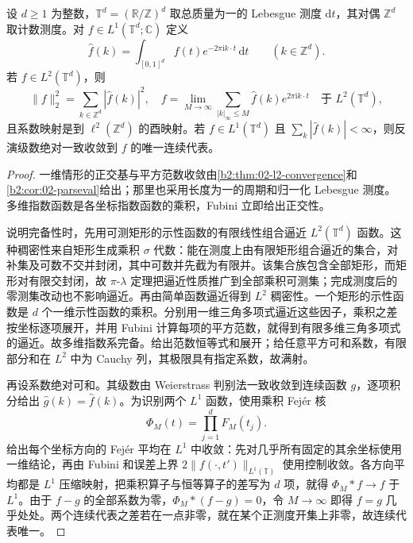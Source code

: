 \begin{theorem}\label{b2:thm:I4-torus-fourier}
设 \(d\ge1\) 为整数，\(\mathbb T^d=(\mathbb R/\mathbb Z)^d\) 取总质量为一的 Lebesgue 测度 \(\mathrm dt\)，其对偶 \(\mathbb Z^d\) 取计数测度。对 \(f\in L^1(\mathbb T^d;\mathbb C)\) 定义
\[
 \widehat f(k)=\int_{[0,1]^d}f(t)e^{-2\pi\mathrm i k\cdot t}\,\mathrm dt
 \qquad(k\in\mathbb Z^d).
\]
若 \(f\in L^2(\mathbb T^d)\)，则
\[
 \|f\|_2^2=\sum_{k\in\mathbb Z^d}|\widehat f(k)|^2,
 \quad
 f=\lim_{M\to\infty}\sum_{|k|_\infty\le M}
             \widehat f(k)e^{2\pi\mathrm i k\cdot t}
             \quad\text{于 }L^2(\mathbb T^d),
\]
且系数映射是到 \(\ell^2(\mathbb Z^d)\) 的酉映射。若 \(f\in L^1(\mathbb T^d)\) 且 \(\sum_k|\widehat f(k)|<\infty\)，则反演级数绝对一致收敛到 \(f\) 的唯一连续代表。
\end{theorem}
\begin{proof}
一维情形的正交基与平方范数收敛由\cref{b2:thm:02-l2-convergence}和\cref{b2:cor:02-parseval}给出；那里也采用长度为一的周期和归一化 Lebesgue 测度。多维指数函数是各坐标指数函数的乘积，Fubini 立即给出正交性。

说明完备性时，先用可测矩形的示性函数的有限线性组合逼近 \(L^2(\mathbb T^d)\) 函数。这种稠密性来自矩形生成乘积 \(\sigma\) 代数：能在测度上由有限矩形组合逼近的集合，对补集及可数不交并封闭，其中可数并先截为有限并。该集合族包含全部矩形，而矩形对有限交封闭，故 \(\pi\)-\(\lambda\) 定理把逼近性质推广到全部乘积可测集；完成测度后的零测集改动也不影响逼近。再由简单函数逼近得到 \(L^2\) 稠密性。一个矩形的示性函数是 \(d\) 个一维示性函数的乘积。分别用一维三角多项式逼近这些因子，乘积之差按坐标逐项展开，并用 Fubini 计算每项的平方范数，就得到有限多维三角多项式的逼近。故多维指数系完备。给出范数恒等式和展开；给任意平方可和系数，有限部分和在 \(L^2\) 中为 Cauchy 列，其极限具有指定系数，故满射。

再设系数绝对可和。其级数由 Weierstrass 判别法一致收敛到连续函数 \(g\)，逐项积分给出 \(\widehat g(k)=\widehat f(k)\)。为识别两个 \(L^1\) 函数，使用乘积 Fejér 核
\[
 \Phi_M(t)=\prod_{j=1}^d F_M(t_j).
\]
给出每个坐标方向的 Fejér 平均在 \(L^1\) 中收敛：先对几乎所有固定的其余坐标使用一维结论，再由 Fubini 和误差上界 \(2\|f(\cdot,t')\|_{L^1(\mathbb T)}\) 使用控制收敛。各方向平均都是 \(L^1\) 压缩映射，把乘积算子与恒等算子的差写为 \(d\) 项，就得 \(\Phi_M*f\to f\) 于 \(L^1\)。由于 \(f-g\) 的全部系数为零，\(\Phi_M*(f-g)=0\)，令 \(M\to\infty\) 即得 \(f=g\) 几乎处处。两个连续代表之差若在一点非零，就在某个正测度开集上非零，故连续代表唯一。
\end{proof}

